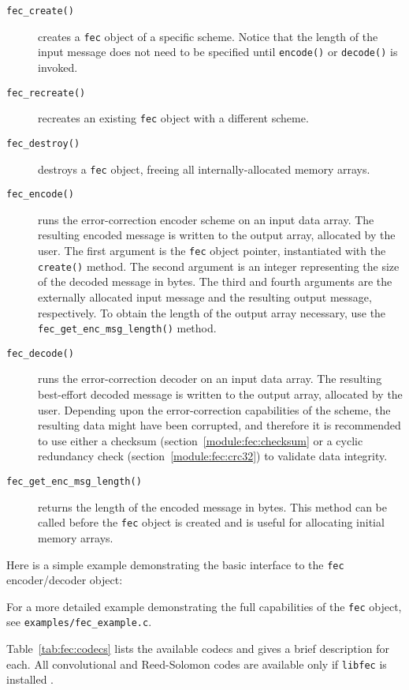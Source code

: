 \begin{description}
\item[{\tt fec\_create()}]
    creates a {\tt fec} object of a specific scheme.
    Notice that the length of the input message does not need to be specified
    until {\tt encode()} or {\tt decode()} is invoked.
\item[{\tt fec\_recreate()}]
    recreates an existing {\tt fec} object with a different scheme.
\item[{\tt fec\_destroy()}]
    destroys a {\tt fec} object, freeing all internally-allocated memory
    arrays.
\item[{\tt fec\_encode()}]
    runs the error-correction encoder scheme on an input data array.
    The resulting encoded message is written to the output array, allocated by
    the user.
    The first argument is the {\tt fec} object pointer, instantiated with the
    {\tt create()} method.
    The second argument is an integer representing the size of the decoded
    message in bytes.
    The third and fourth arguments are the externally allocated input message
    and the resulting output message, respectively.
    To obtain the length of the output array necessary, use the
    {\tt fec\_get\_enc\_msg\_length()} method.
\item[{\tt fec\_decode()}]
    runs the error-correction decoder on an input data array.
    The resulting best-effort decoded message is written to the output array,
    allocated by the user.
    Depending upon the error-correction capabilities of the scheme, the
    resulting data might have been corrupted, and therefore it is recommended
    to use either a
    checksum (section~\ref{module:fec:checksum} or a
    cyclic redundancy check (section~\ref{module:fec:crc32})
    to validate data integrity.
\item[{\tt fec\_get\_enc\_msg\_length()}]
    returns the length of the encoded message in bytes.
    This method can be called before the {\tt fec} object is created and is
    useful for allocating initial memory arrays.
\end{description}

Here is a simple example demonstrating the basic interface to the {\tt fec}
encoder/decoder object:

For a more detailed example demonstrating the full capabilities of the
{\tt fec} object, see {\tt examples/fec\_example.c}.

Table~\ref{tab:fec:codecs} lists the available codecs and gives a brief
description for each.
All convolutional and Reed-Solomon codes are available only if {\tt libfec} is
installed \cite{fec:web}.

